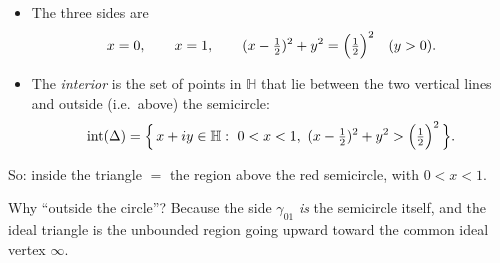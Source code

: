 \documentclass[12pt,a4paper]{article}
\newcommand{\HH}{\mathbb{H}}
\theoremstyle{plain}
\theoremstyle{definition}      %
\begin{document}
	\begin{itemize}
		\item The three sides are
		\[
		x=0,\qquad x=1,\qquad (x-\tfrac12)^2+y^2=\Bigl(\tfrac12\Bigr)^2 \quad (y>0).
		\]
		
		\item The \emph{interior} is the set of points in $\HH$ that lie between the two vertical lines and
		outside (i.e.\ above) the semicircle:
		\[
		\operatorname{int}(\Delta)
		=\Bigl\{\,x+iy\in\HH:\ 0<x<1,\ (x-\tfrac12)^2+y^2>\Bigl(\tfrac12\Bigr)^2\,\Bigr\}.
		\]
	\end{itemize}
	
	So: inside the triangle $=$ the region above the red semicircle, with $0<x<1$.
	
	\medskip
	
	Why ``outside the circle''? Because the side $\gamma_{01}$ \emph{is} the semicircle itself, and the ideal triangle is the
	unbounded region going upward toward the common ideal vertex $\infty$.
	
\end{document}
